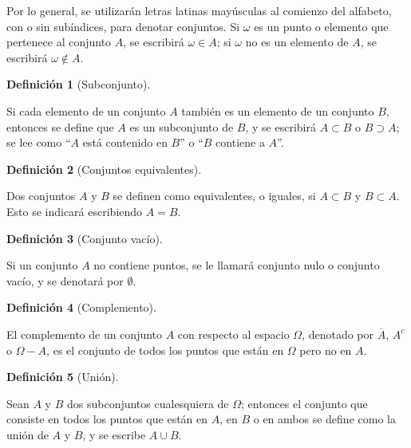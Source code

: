 \documentclass[
  us-letterpaper,
]{scrreprt}
\theoremstyle{plain}
\theoremstyle{definition}
\newtheorem{definition}{Definición}[chapter]
\theoremstyle{definition}
\theoremstyle{plain}
\theoremstyle{remark}
\begin{document}
Por lo general, se utilizarán letras latinas mayúsculas al comienzo del
alfabeto, con o sin subíndices, para denotar conjuntos. Si \(\omega\) es
un punto o elemento que pertenece al conjunto \(A\), se escribirá
\(\omega \in A\); si \(\omega\) no es un elemento de \(A\), se escribirá
\(\omega \notin A\).

\begin{definition}[Subconjunto]\protect\hypertarget{def-sub}{}\label{def-sub}

Si cada elemento de un conjunto \(A\) también es un elemento de un
conjunto \(B\), entonces se define que \(A\) es un subconjunto de \(B\),
y se escribirá \(A\subset B\) o \(B\supset A\); se lee como ``\(A\) está
contenido en \(B\)'' o ``\(B\) contiene a \(A\)''.

\end{definition}

\begin{definition}[Conjuntos
equivalentes]\protect\hypertarget{def-ce}{}\label{def-ce}

Dos conjuntos \(A\) y \(B\) se definen como equivalentes, o iguales, si
\(A\subset B\) y \(B\subset A\). Esto se indicará escribiendo \(A=B\).

\end{definition}

\begin{definition}[Conjunto
vacío]\protect\hypertarget{def-emptyset}{}\label{def-emptyset}

Si un conjunto \(A\) no contiene puntos, se le llamará conjunto nulo o
conjunto vacío, y se denotará por \(\emptyset\).

\end{definition}

\begin{definition}[Complemento]\protect\hypertarget{def-comp}{}\label{def-comp}

El complemento de un conjunto \(A\) con respecto al espacio \(\Omega\),
denotado por \(\overline{A}\), \(A^c\) o \(\Omega-A\), es el conjunto de
todos los puntos que están en \(\Omega\) pero no en \(A\).

\end{definition}

\begin{definition}[Unión]\protect\hypertarget{def-union}{}\label{def-union}

Sean \(A\) y \(B\) dos subconjuntos cualesquiera de \(\Omega\); entonces
el conjunto que consiste en todos los puntos que están en \(A\), en
\(B\) o en ambos se define como la unión de \(A\) y \(B\), y se escribe
\(A \cup B\).

\end{definition}
\end{document}
